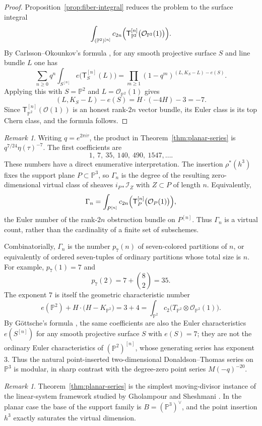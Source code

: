 \documentclass[12pt]{amsart}
\numberwithin{equation}{section}
\newcommand{\PP}{\mathbb{P}}
\newcommand{\OO}{\mathcal{O}}
\newcommand{\I}{\mathcal{I}}
\newcommand{\Ttw}{\mathsf{T}}
\newcommand{\dual}{\vee}
\theoremstyle{plain}
\theoremstyle{definition}
\theoremstyle{remark}
\newtheorem{remark}[theorem]{Remark}
\begin{document}
\begin{proof}
Proposition~\ref{prop:fiber-integral} reduces the problem to the surface integral
\[
\int_{(\PP^2)^{[n]}} c_{2n}\Bigl(\Ttw_{\PP^2}^{[n]}\bigl(\OO_{\PP^2}(1)\bigr)\Bigr).
\]
By Carlsson--Okounkov's formula \cite[Cor.~1]{CO}, for any smooth projective surface $S$ and line bundle $L$ one has
\[
\sum_{n\ge 0} q^n\int_{S^{[n]}} e\bigl(\Ttw_S^{[n]}(L)\bigr)
=
\prod_{m\ge 1}(1-q^m)^{(L,K_S-L)-e(S)}.
\]
Applying this with $S=\PP^2$ and $L=\OO_{\PP^2}(1)$ gives
\[
(L,K_S-L)-e(S)=H\cdot (-4H)-3=-7.
\]
Since $\Ttw_{\PP^2}^{[n]}(\OO(1))$ is an honest rank-$2n$ vector bundle, its Euler class is its top Chern class, and the formula follows.
\end{proof}

\begin{remark}\label{rem:eta}
Writing $q=e^{2\pi i\tau}$, the product in Theorem~\ref{thm:planar-series} is $q^{7/24}\eta(\tau)^{-7}$.
The first coefficients are
\[
1,\ 7,\ 35,\ 140,\ 490,\ 1547,\ldots.
\]
These numbers have a direct enumerative interpretation.
The insertion $\rho^*(h^3)$ fixes the support plane $P\subset \PP^3$, so $\Gamma_n$ is the degree of the resulting zero-dimensional virtual class of sheaves $i_{P*}\I_Z$ with $Z\subset P$ of length $n$.
Equivalently,
\[
\Gamma_n
=
\int_{P^{[n]}}c_{2n}\Bigl(\Ttw_P^{[n]}\bigl(\OO_P(1)\bigr)\Bigr),
\]
the Euler number of the rank-$2n$ obstruction bundle on $P^{[n]}$.
Thus $\Gamma_n$ is a virtual count, rather than the cardinality of a finite set of subschemes.

Combinatorially, $\Gamma_n$ is the number $p_7(n)$ of seven-colored partitions of $n$, or equivalently of ordered seven-tuples of ordinary partitions whose total size is $n$.
For example, $p_7(1)=7$ and
\[
p_7(2)=7+\binom{8}{2}=35.
\]
The exponent $7$ is itself the geometric characteristic number
\[
e(\PP^2)+H\cdot\bigl(H-K_{\PP^2}\bigr)
=3+4
=\int_{\PP^2}c_2\bigl(T_{\PP^2}\otimes\OO_{\PP^2}(1)\bigr).
\]
By G\"ottsche's formula \cite{Gottsche}, the same coefficients are also the Euler characteristics $e(S^{[n]})$ for any smooth projective surface $S$ with $e(S)=7$; they are not the ordinary Euler characteristics of $(\PP^2)^{[n]}$, whose generating series has exponent $3$.
Thus the natural point-inserted two-dimensional Donaldson--Thomas series on $\PP^3$ is modular, in sharp contrast with the degree-zero point series $M(-q)^{-20}$.
\end{remark}

\begin{remark}\label{rem:linear-systems}
Theorem~\ref{thm:planar-series} is the simplest moving-divisor instance of the linear-system framework studied by Gholampour and Sheshmani \cite{GSlinear}.
In the planar case the base of the support family is $B=(\PP^3)^\dual$, and the point insertion $h^3$ exactly saturates the virtual dimension.
\end{remark}
\end{document}

